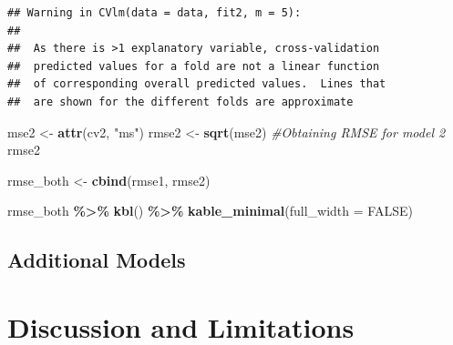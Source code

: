 \documentclass[
]{article}
\newenvironment{Shaded}{\begin{snugshade}}{\end{snugshade}}
\newcommand{\AttributeTok}[1]{\textcolor[rgb]{0.13,0.29,0.53}{#1}}
\newcommand{\CommentTok}[1]{\textcolor[rgb]{0.56,0.35,0.01}{\textit{#1}}}
\newcommand{\ConstantTok}[1]{\textcolor[rgb]{0.56,0.35,0.01}{#1}}
\newcommand{\FunctionTok}[1]{\textcolor[rgb]{0.13,0.29,0.53}{\textbf{#1}}}
\newcommand{\NormalTok}[1]{#1}
\newcommand{\OtherTok}[1]{\textcolor[rgb]{0.56,0.35,0.01}{#1}}
\newcommand{\SpecialCharTok}[1]{\textcolor[rgb]{0.81,0.36,0.00}{\textbf{#1}}}
\newcommand{\StringTok}[1]{\textcolor[rgb]{0.31,0.60,0.02}{#1}}
\begin{document}
\begin{verbatim}
## Warning in CVlm(data = data, fit2, m = 5): 
## 
##  As there is >1 explanatory variable, cross-validation
##  predicted values for a fold are not a linear function
##  of corresponding overall predicted values.  Lines that
##  are shown for the different folds are approximate
\end{verbatim}

\begin{Shaded}
\begin{Highlighting}[]
\NormalTok{mse2 }\OtherTok{\textless{}{-}} \FunctionTok{attr}\NormalTok{(cv2, }\StringTok{"ms"}\NormalTok{)}
\NormalTok{rmse2 }\OtherTok{\textless{}{-}} \FunctionTok{sqrt}\NormalTok{(mse2)                       }\CommentTok{\#Obtaining RMSE for model 2}
\NormalTok{rmse2}

\NormalTok{rmse\_both }\OtherTok{\textless{}{-}} \FunctionTok{cbind}\NormalTok{(rmse1, rmse2)}

\NormalTok{rmse\_both }\SpecialCharTok{\%\textgreater{}\%} \FunctionTok{kbl}\NormalTok{() }\SpecialCharTok{\%\textgreater{}\%} \FunctionTok{kable\_minimal}\NormalTok{(}\AttributeTok{full\_width =} \ConstantTok{FALSE}\NormalTok{)}
\end{Highlighting}
\end{Shaded}

\hypertarget{additional-models-1}{%
\subsection{Additional Models}\label{additional-models-1}}

\hypertarget{discussion-and-limitations}{%
\section{Discussion and Limitations}\label{discussion-and-limitations}}
\end{document}
